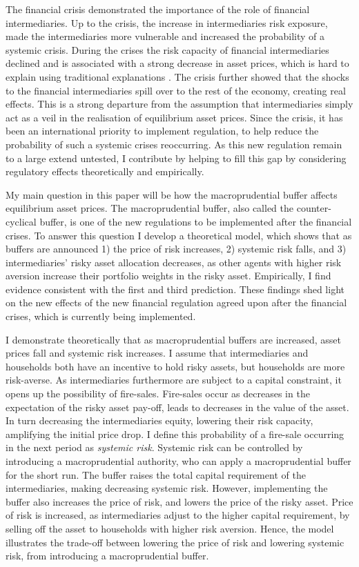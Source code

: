 \documentclass[11pt]{article}
\begin{document}
The financial crisis demonstrated the importance of the role of financial intermediaries. Up to the crisis, the increase in intermediaries risk exposure, made the intermediaries more vulnerable and increased the probability of a systemic crisis. During the crises the risk capacity of financial intermediaries declined and is associated with a strong decrease in asset prices, which is hard to explain using traditional explanations \citep*{He2013, Adrian2014, Brunnermeier2014}. The crisis further showed that the shocks to the financial intermediaries spill over to the rest of the economy, creating real effects.
This is a strong departure from the assumption that intermediaries simply act as a veil in the realisation of equilibrium asset prices. 
Since the crisis, it has been an international priority to implement regulation, to help reduce the probability of such a systemic crises reoccurring. As this new regulation remain to a large extend untested, I contribute by helping to fill this gap by considering regulatory effects theoretically and empirically.

My main question in this paper will be how the macroprudential buffer affects equilibrium asset prices. The macroprudential buffer, also called the counter-cyclical buffer, is one of the new regulations to be implemented after the financial crises. To answer this question I develop a theoretical model, which shows that as buffers are announced 1) the price of risk increases, 2) systemic risk falls, and 3) intermediaries' risky asset allocation decreases, as other agents with higher risk aversion increase their portfolio weights in the risky asset.
Empirically, I find evidence consistent with the first and third prediction. These findings shed light on the new effects of the new financial regulation agreed upon after the financial crises, which is currently being implemented.


I demonstrate theoretically that as macroprudential buffers are increased, asset prices fall and systemic risk increases. I assume that intermediaries and households both have an incentive to hold risky assets, but households are more risk-averse. As intermediaries furthermore are subject to a capital constraint, it opens up the possibility of fire-sales. Fire-sales occur as decreases in the expectation of the risky asset pay-off, leads to decreases in the value of the asset. In turn decreasing the intermediaries equity, lowering their risk capacity, amplifying the initial price drop. I define this probability of a fire-sale occurring in the next period as \emph{systemic risk}. Systemic risk can be controlled by introducing a macroprudential authority, who can apply a macroprudential buffer for the short run. The buffer raises the total capital requirement of the intermediaries, making decreasing systemic risk. However, implementing the buffer also increases the price of risk, and lowers the price of the risky asset. Price of risk is increased, as intermediaries adjust to the higher capital requirement, by selling off the asset to households with higher risk aversion. Hence, the model illustrates the trade-off between lowering the price of risk and lowering systemic risk, from introducing a macroprudential buffer.
 
\end{document}
